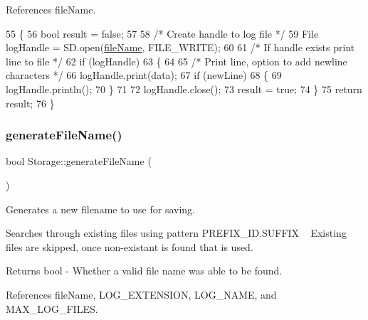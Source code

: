 References file\+Name.


\begin{DoxyCode}
55 \{
56   \textcolor{keywordtype}{bool} result = \textcolor{keyword}{false};
57 
58   \textcolor{comment}{/* Create handle to log file */}
59   File logHandle = SD.open(\hyperlink{class_logging_device_1_1_storage_ac1054cb167ed5818aea16229ac713da8}{fileName}, FILE\_WRITE);
60 
61   \textcolor{comment}{/* If handle exists print line to file */}
62   \textcolor{keywordflow}{if} (logHandle)
63   \{
64 
65     \textcolor{comment}{/* Print line, option to add newline characters */}
66     logHandle.print(data);
67     \textcolor{keywordflow}{if} (newLine)
68     \{
69       logHandle.println();
70     \}
71 
72     logHandle.close();
73     result = \textcolor{keyword}{true};
74   \}
75   \textcolor{keywordflow}{return} result;
76 \}
\end{DoxyCode}
\mbox{\label{class_logging_device_1_1_storage_a571ce9630665d9407ffbaeff55c47b0a}} 
\subsubsection{\texorpdfstring{generate\+File\+Name()}{generateFileName()}}
{\footnotesize\ttfamily bool Storage\+::generate\+File\+Name (\begin{DoxyParamCaption}{ }\end{DoxyParamCaption})}



Generates a new filename to use for saving. 

Searches through existing files using pattern P\+R\+E\+F\+I\+X\+\_\+\+I\+D.\+S\+U\+F\+F\+IX ~\newline
Existing files are skipped, once non-\/existant is found that is used.

\begin{DoxyReturn}{Returns}
bool -\/ Whether a valid file name was able to be found. 
\end{DoxyReturn}


References file\+Name, L\+O\+G\+\_\+\+E\+X\+T\+E\+N\+S\+I\+ON, L\+O\+G\+\_\+\+N\+A\+ME, and M\+A\+X\+\_\+\+L\+O\+G\+\_\+\+F\+I\+L\+ES.


